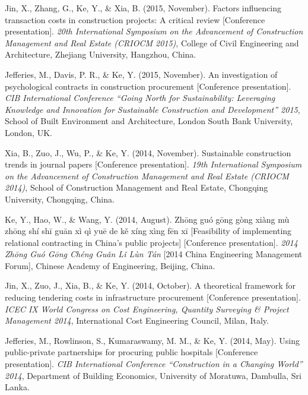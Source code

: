 \documentclass[11pt,a4paper]{report} %
\begin{document}
\begin{tablist}
        \item[2015] \tab{}Jin, X., Zhang, G., Ke, Y., \& Xia, B. (2015, November). Factors influencing transaction costs in construction projects: A critical review [Conference presentation]. \textit{20th International Symposium on the Advancement of Construction Management and Real Estate (CRIOCM 2015)}, College of Civil Engineering and Architecture, Zhejiang University, Hangzhou, China.
        
        \item[2015] \tab{}Jefferies, M., Davis, P. R., \& Ke, Y. (2015, November). An investigation of psychological contracts in construction procurement [Conference presentation]. \textit{CIB International Conference “Going North for Sustainability: Leveraging Knowledge and Innovation for Sustainable Construction and Development” 2015}, School of Built Environment and Architecture, London South Bank University, London, UK.
        
        \item[2014] \tab{}Xia, B., Zuo, J., Wu, P., \& Ke, Y. (2014, November). Sustainable construction trends in journal papers [Conference presentation]. \textit{19th International Symposium on the Advancement of Construction Management and Real Estate (CRIOCM 2014)}, School of Construction Management and Real Estate, Chongqing University, Chongqing, China.
        
        \item[2014] \tab{}Ke, Y., Hao, W., \& Wang, Y. (2014, August). Zhōng guó gōng gòng xiàng mù zhōng shí shī guān xì qì yuē de kě xíng xìng fēn xī [Feasibility of implementing relational contracting in China's public projects] [Conference presentation]. \textit{2014 Zhōng Guó Gōng Chéng Guǎn Lǐ Lùn Tán} [2014 China Engineering Management Forum], Chinese Academy of Engineering, Beijing, China.
        
        \item[2014] \tab{}Jin, X., Zuo, J., Xia, B., \& Ke, Y. (2014, October). A theoretical framework for reducing tendering costs in infrastructure procurement [Conference presentation]. \textit{ICEC IX World Congress on Cost Engineering, Quantity Surveying \& Project Management 2014}, International Cost Engineering Council, Milan, Italy.
        
        \item[2014] \tab{}Jefferies, M., Rowlinson, S., Kumaraswamy, M. M., \& Ke, Y. (2014, May). Using public-private partnerships for procuring public hospitals [Conference presentation]. \textit{CIB International Conference “Construction in a Changing World” 2014}, Department of Building Economics, University of Moratuwa, Dambulla, Sri Lanka.
        

\end{tablist}
\end{document}
